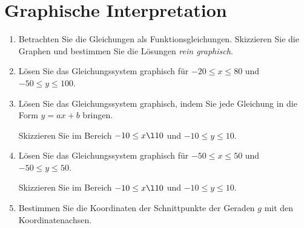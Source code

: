 \section{Graphische Interpretation}
\begin{enumerate}[label=\alph*)]
\item Betrachten Sie die Gleichungen als
 Funktionsgleichungen. Skizzieren Sie die Graphen und bestimmen Sie
 die Lösungen \textit{rein graphisch}.




\newpage
\item

Lösen Sie das Gleichungssystem graphisch für $-20 \le x \le 80$ und
$-50\le y \le 100$.




\newpage
\item
Lösen Sie das Gleichungssystem graphisch, indem Sie jede Gleichung in
die Form $y=ax+b$ bringen.

Skizzieren Sie im Bereich $-10 \le x \l 10$ und $-10 \le y \le 10$.



\newpage

\item
Lösen Sie das Gleichungssystem graphisch für $-50 \le x \le 50$ und
$-50 \le y \le 50$.


Skizzieren Sie im Bereich $-10 \le x \l 10$ und $-10 \le y \le 10$.


\newpage
\item Bestimmen Sie die Koordinaten der Schnittpunkte der Geraden $g$
mit den Koordinatenachsen.


\end{enumerate}
